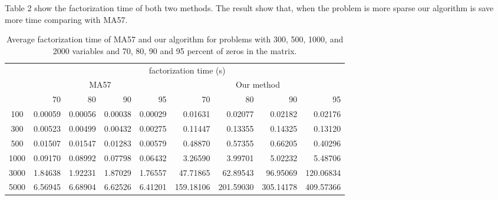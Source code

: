 \documentclass{article}
\begin{document}
\ifx 
Table 2 show the factorization time of both two methods.
The result show that, when the problem is more sparse our algorithm is save more time comparing with MA57. 
\begin{table}
\caption{Average factorization time of MA57 and our algorithm for problems with 300, 500, 1000, and 2000 variables and 70, 80, 90 and 95 percent of zeros in the matrix.}
\begin{tabular}{|c|r|r|r|r|r|r|r|r|}
\hline
\multirow{3}{*}{} 
&\multicolumn{8}{c|}{factorization time (s)}\\
\cline{2-9}
&\multicolumn{4}{c|}{MA57}
&\multicolumn{4}{c|}{Our method}\\
\cline{2-9}
&70
&80
&90
&95
&70
&80
&90
&95\\
\hline
100	&	0.00059	&	0.00056	&	0.00038	&	0.00029	&	0.01631	&	0.02077	&	0.02182	&	0.02176	\\													
300	&	0.00523	&	0.00499	&	0.00432	&	0.00275	&	0.11447	&	0.13355	&	0.14325	&	0.13120	\\													
500	&	0.01507	&	0.01547	&	0.01283	&	0.00579	&	0.48870	&	0.57355	&	0.66205	&	0.40296	\\													
1000	&	0.09170	&	0.08992	&	0.07798	&	0.06432	&	3.26590	&	3.99701	&	5.02232	&	5.48706	\\													
3000	&	1.84638	&	1.92231	&	1.87029	&	1.76557	&	47.71865	&	62.89543	&	96.95069	&	120.06834	\\													
5000	&	6.56945	&	6.68904	&	6.62526	&	6.41201	&	159.18106	&	201.59030	&	305.14178	&	409.57366	\\													\hline
\end{tabular}
\end{table}
\fi
\end{document}
